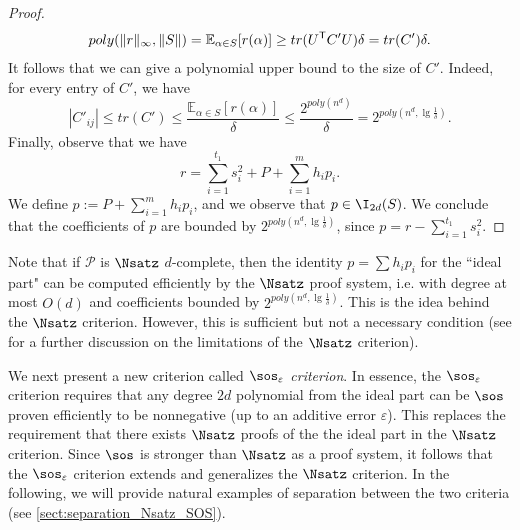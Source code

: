 \documentclass[11pt]{article}
\begin{document}
\begin{proof}
    \begin{align*}
        poly(\| r \|_{\infty}, \| S \|) = \mathbb{E}_{\alpha \in S} [r(\alpha)] \geq tr(U^{\sf{T}} C' U) \delta = tr(C') \delta.
    \end{align*}
    It follows that we can give a polynomial upper bound to the size of $C'$. Indeed, for every entry of $C'$, we have
    \begin{equation*}
        |C'_{ij}| \leq tr(C') \leq \frac{\mathbb{E}_{\alpha \in S} [r(\alpha)]}{\delta} \leq \frac{2^{poly(n^d)}}{\delta} = 2^{poly(n^d, \lg \frac{1}{\delta})}.
    \end{equation*}
    Finally, observe that we have
    $$r=\sum_{i=1}^{t_1}s_i^2 + P + \sum_{i=1}^mh_ip_i.$$
    We define $p:= P + \sum_{i=1}^mh_ip_i$, and we observe that $p\in \I_{2d}(S)$.  We conclude that the coefficients of $p$ are bounded by $2^{poly(n^d, \lg \frac{1}{\delta})}$, since $p=r-\sum_{i=1}^{t_1}s_i^2$.
\end{proof}

Note that if $\mathcal{P}$ is $\Nsatz$ $d$-complete, then the identity $p=\sum h_i p_i$ for the ``ideal part" can be computed efficiently by the $\Nsatz$ proof system, i.e. with degree at most $O(d)$ and coefficients bounded by $2^{poly(n^d, \lg \frac{1}{\delta})}$. This is the idea behind the $\Nsatz$ criterion. However, this is sufficient but not a necessary condition (see \cite{raghavendra_weitz2017} for a further discussion on the limitations of the $\Nsatz$ criterion).

We next present a new criterion called \textit{$\sos_{\varepsilon}$ criterion}. In essence, the $\sos_{\varepsilon}$ criterion requires that any degree $2d$ polynomial from the ideal part can be $\sos$ proven efficiently to be nonnegative (up to an additive error $\varepsilon$).  This replaces the requirement that there exists $\Nsatz$ proofs of the the ideal part in the $\Nsatz$ criterion. Since $\sos$ is stronger than $\Nsatz$ as a proof system, it follows that the $\sos_{\varepsilon}$ criterion extends and generalizes the $\Nsatz$ criterion. In the following, we will provide natural examples of separation between the two criteria (see \cref{sect:separation_Nsatz_SOS}).
\end{document}
